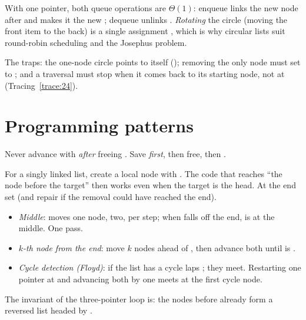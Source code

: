With one pointer, both queue operations are $\Theta(1)$: enqueue links the new node
after  and makes it the new ; dequeue unlinks .
\emph{Rotating} the circle (moving the front item to the back) is a single assignment
, which is why circular lists suit round-robin scheduling and the
Josephus problem.


The traps: the one-node circle points to itself (); removing the only node
must set  to ; and a traversal must stop when it comes back to its
starting node, not at  (Tracing~\ref{trace:24}).

\section{Programming patterns}\label{sec:llpatterns}

 Never advance with  \emph{after} freeing
. Save  \emph{first}, then free, then .

 For a singly linked list, create a local node  with
. The code that reaches ``the node before the target'' then works
even when the target is the head. At the end set  (and repair
 if the removal could have reached the end).

\begin{itemize}
\item \emph{Middle}:  moves one node,  two, per step; when 
  falls off the end,  is at the middle. One pass.
\item \emph{$k$-th node from the end}: move  $k$ nodes ahead of , then
  advance both until  is .
\item \emph{Cycle detection (Floyd)}: if the list has a cycle  laps ; they
  meet. Restarting one pointer at  and advancing both by one meets at the first
  cycle node.
\end{itemize}

 The invariant of the three-pointer loop is: the nodes before 
already form a reversed list headed by .

